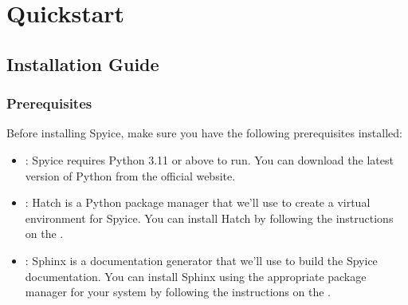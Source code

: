 \documentclass[a4paper,11pt,english,openany]{sphinxmanual}
\begin{document}
\sphinxstepscope


\chapter{Quickstart}
\label{\detokenize{quick_start/_index:quickstart}}\label{\detokenize{quick_start/_index::doc}}
\sphinxstepscope


\section{Installation Guide}
\label{\detokenize{quick_start/installation:installation-guide}}\label{\detokenize{quick_start/installation::doc}}

\subsection{Prerequisites}
\label{\detokenize{quick_start/installation:prerequisites}}
\sphinxAtStartPar
Before installing Spyice, make sure you have the following prerequisites installed:
\begin{itemize}
\item {} 
\sphinxAtStartPar
{}: Spyice requires Python 3.11 or above to run. You can download the latest version of Python from the official website.

\item {} 
\sphinxAtStartPar
{}: Hatch is a Python package manager that we’ll use to create a virtual environment for Spyice. You can install Hatch by following the instructions on the .

\item {} 
\sphinxAtStartPar
{}: Sphinx is a documentation generator that we’ll use to build the Spyice documentation. You can install Sphinx using the appropriate package manager for your system by following the instructions on the .

\end{itemize}
\end{document}
